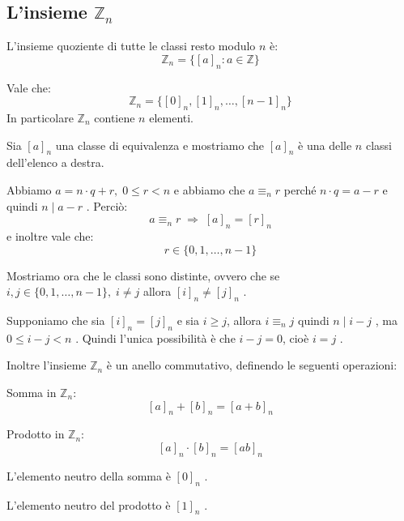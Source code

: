 \documentclass[
  a4paper,
]{article}
\begin{document}
\hypertarget{linsieme-mathbbz_n}{%
\subsection{\texorpdfstring{L'insieme
\(\mathbb{Z}_n\)}{L'insieme \textbackslash mathbb\{Z\}\_n}}\label{linsieme-mathbbz_n}}

\begin{definitionbox}
L'insieme quoziente di tutte le classi resto modulo \(n\) è: \[
\mathbb{Z}_n = \{\left[a\right]_n : a \in \mathbb{Z}\}
\]
\end{definitionbox}

\begin{propositionbox}
Vale che: \[
\mathbb{Z}_n = \{[0]_n, [1]_n, \dots, [n-1]_n \}
\] In particolare \(\mathbb{Z}_n\) contiene \(n\) elementi.
\end{propositionbox}

\begin{proofbox}
Sia \(\left[a\right]_n\) una classe di equivalenza e mostriamo che
\(\left[a\right]_n\) è una delle \(n\) classi dell'elenco a destra.

Abbiamo \(a = n \cdot q + r, \; 0 \le r < n\) e abbiamo che
\(a \equiv_n r\) perché \(n \cdot q = a -r\) e quindi \(n \mid a-r\) .
Perciò: \[
a \equiv_n r \; \Longrightarrow \; \left[a\right]_n = [r]_n
\] e inoltre vale che: \[
r \in \{0, 1, \dots, n-1\}
\]

Mostriamo ora che le classi sono distinte, ovvero che se
\(i, j \in \{0, 1, \dots, n-1\}, \; i \neq j\) allora
\([i]_n \neq [j]_n\) .

Supponiamo che sia \([i]_n = [j]_n\) e sia \(i \ge j\), allora
\(i \equiv_n j\) quindi \(n \mid i - j\) , ma \(0 \leq i - j < n\) .
Quindi l'unica possibilità è che \(i - j = 0\), cioè \(i = j\) .
\end{proofbox}

Inoltre l'insieme \(\mathbb{Z}_n\) è un anello commutativo, definendo le
seguenti operazioni:

\begin{definitionbox}
Somma in \(\mathbb{Z}_n\): \[
\left[a\right]_n + [b]_n = [a + b]_n
\]

Prodotto in \(\mathbb{Z}_n\): \[
\left[a\right]_n \cdot [b]_n = [a  b]_n
\]
\end{definitionbox}

\begin{observationbox}
L'elemento neutro della somma è \([0]_n\) .

L'elemento neutro del prodotto è \([1]_n\) .
\end{observationbox}
\end{document}
